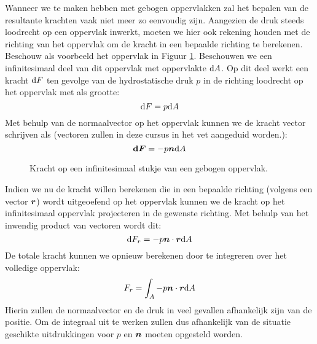 Wanneer we te maken hebben met gebogen oppervlakken zal het bepalen van de resultante krachten vaak niet meer zo eenvoudig zijn. Aangezien de druk steeds loodrecht op een oppervlak inwerkt, moeten we hier ook rekening houden met de richting van het oppervlak om de kracht in een bepaalde richting te berekenen. Beschouw als voorbeeld het oppervlak in Figuur \ref{fig:kracht_gebogen_oppervlak}. Beschouwen we een infinitesimaal deel van dit oppervlak met oppervlakte $\mathrm{d} A$. Op dit deel werkt een kracht $\mathrm{d} F$ ten gevolge van de hydrostatische druk $p$ in de richting loodrecht op het oppervlak met als grootte:
\begin{equation}
	\mathrm{d} F = p \mathrm{d} A
\end{equation}
Met behulp van de normaalvector op het oppervlak kunnen we de kracht vector schrijven als (vectoren zullen in deze cursus in het vet aangeduid worden.):
\begin{equation}
	\boldsymbol{\mathrm{d} F} = -p \boldsymbol{n} \mathrm{d} A
\end{equation}
\begin{figure}[htb]
	\centering
	
	\caption{Kracht op een infinitesimaal stukje van een gebogen oppervlak.}
	\label{fig:kracht_gebogen_oppervlak}
\end{figure}
Indien we nu de kracht willen berekenen die in een bepaalde richting (volgens een vector $\boldsymbol{r}$) wordt uitgeoefend op het oppervlak kunnen we de kracht op het infinitesimaal oppervlak projecteren in de gewenste richting. Met behulp van het inwendig product van vectoren wordt dit:
\begin{equation}
	\mathrm{d} F_r = -p \boldsymbol{n} \cdot \boldsymbol{r} \mathrm{d} A
\end{equation}
De totale kracht kunnen we opnieuw berekenen door te integreren over het volledige oppervlak:
\begin{equation}
	F_r = \int_A -p \boldsymbol{n} \cdot \boldsymbol{r} \mathrm{d} A
\end{equation}
Hierin zullen de normaalvector en de druk in veel gevallen afhankelijk zijn van de positie. Om de integraal uit te werken zullen dus afhankelijk van de situatie geschikte uitdrukkingen voor $p$ en $\boldsymbol{n}$ moeten opgesteld worden.

